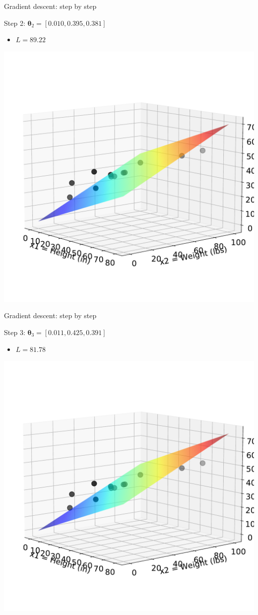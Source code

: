 \documentclass[ignorenonframetext,]{beamer}
\providecommand{\tightlist}{%
  \setlength{\itemsep}{0pt}\setlength{\parskip}{0pt}}
\newcommand{\vv}[1]{\boldsymbol{#1}}
\begin{document}
\begin{frame}{Gradient descent: step by step}
\protect\hypertarget{gradient-descent-step-by-step-2}{}

Step 2: \(\vv{\theta}_2 = [0.010, 0.395, 0.381]\)

\begin{itemize}
\tightlist
\item
  \(L = 89.22\)
\end{itemize}

\begin{center}\includegraphics[width=0.5\linewidth]{lecture3_files/figure-beamer/unnamed-chunk-9-1} \end{center}

\end{frame}

\begin{frame}{Gradient descent: step by step}
\protect\hypertarget{gradient-descent-step-by-step-3}{}

Step 3: \(\vv{\theta}_3 = [0.011,0.425,0.391]\)

\begin{itemize}
\tightlist
\item
  \(L = 81.78\)
\end{itemize}

\begin{center}\includegraphics[width=0.5\linewidth]{lecture3_files/figure-beamer/unnamed-chunk-10-1} \end{center}

\end{frame}
\end{document}
